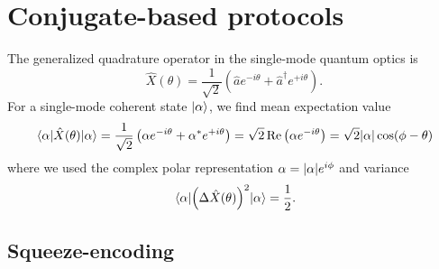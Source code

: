 \section{Conjugate-based protocols}





The generalized quadrature operator in the single-mode quantum optics is~\cite[p.~36]{Barnett2002}
\begin{equation}
	\hat{X}(\theta)
	=
	\frac{1}{\sqrt{2}}
	\left(
		\hat{a}
		e^{-i\theta}
		+
		\hat{a}^\dagger
		e^{+i\theta}
	\right)
	.
\end{equation}
For a single-mode coherent state $\ket{\alpha}$, we find mean expectation value
\begin{equation}
	\expval{\hat{X}(\theta)}{\alpha}
	=
	\frac{1}{\sqrt{2}}
	\left(
		\alpha
		e^{-i\theta}
		+
		\alpha^*
		e^{+i\theta}
	\right)
	=
	\sqrt{2}
	\operatorname{\operatorname{Re}}\left(
		\alpha
		e^{-i\theta}
	\right)
	=
	\sqrt{2}
	\abs{\alpha}
	\cos(\phi-\theta)
\end{equation}
where we used the complex polar representation $\alpha=\abs{\alpha}e^{i\phi}$ and variance~\cite[p.~59]{Barnett2002}
\begin{equation}
	\expval{\left(\Delta\hat{X}(\theta)\right)^2}{\alpha}
	=
	\frac{1}{2}
	.
\end{equation}

\subsection{Squeeze-encoding}

